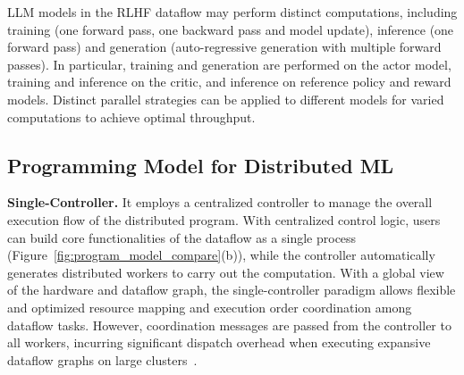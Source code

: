 LLM models in the RLHF dataflow may %
perform distinct computations, including training (one forward pass, one backward pass and model update), inference (one forward pass) and generation (auto-regressive generation with multiple forward passes). In particular, training and generation are performed on the actor model, training and inference on the critic, and inference on reference policy and reward models.
Distinct parallel strategies can be applied to different models for varied computations to achieve optimal throughput. %


















\subsection{Programming Model for Distributed ML} \label{sec:motivate_programming_model}


\noindent \textbf{Single-Controller.} %
It employs a centralized controller to manage the overall execution flow of the distributed program. With centralized control logic, users can build core functionalities of the dataflow as a single process (Figure~\ref{fig:program_model_compare}(b)), while the controller automatically generates distributed workers to carry out the computation.
With a global view of the hardware and dataflow graph, the single-controller paradigm allows flexible and optimized %
resource mapping and execution order coordination among dataflow tasks. 
However, coordination messages are passed from the controller to all workers, %
incurring significant dispatch overhead when executing expansive dataflow graphs on large clusters~\cite{abadi2016tensorflow, barham2022pathways}. 




